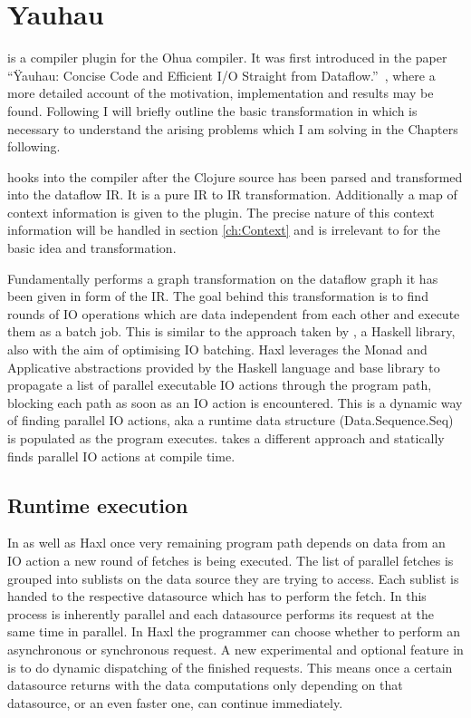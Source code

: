 \chapter{Yauhau}

\label{ch:Yauhau}

\yauhau{} is a compiler plugin for the Ohua compiler.
It was first introduced in the paper ``Ÿauhau: Concise Code and Efficient I/O Straight from Dataflow.''~\cite{ErtelGoensAdamEtAl2016}, where a more detailed account of the motivation, implementation and results may be found.
Following I will briefly outline the basic transformation in \yauhau{} which is necessary to understand the arising problems which I am solving in the Chapters following.

\yauhau{} hooks into the compiler after the Clojure source has been parsed and transformed into the dataflow IR.
It is a pure IR to IR transformation.
Additionally a map of context information is given to the plugin.
The precise nature of this context information will be handled in section \ref{ch:Context} and is irrelevant to for the basic \yauhau{} idea and transformation.

Fundamentally \yauhau{} performs a graph transformation on the dataflow graph it has been given in form of the IR.
The goal behind this transformation is to find rounds of IO operations which are data independent from each other and execute them as a batch job.
This is similar to the approach taken by \cite{Haxl:library:link}, a Haskell library, also with the aim of optimising IO batching.
Haxl leverages the Monad and Applicative abstractions provided by the Haskell language and base library to propagate a list of parallel executable IO actions through the program path, blocking each path as soon as an IO action is encountered.
This is a dynamic way of finding parallel IO actions, aka a runtime data structure (Data.Sequence.Seq) is populated as the program executes.
\yauhau{} takes a different approach and statically finds parallel IO actions at compile time.

\section{Runtime execution}

In \yauhau{} as well as Haxl once very remaining program path depends on data from an IO action a new round of fetches is being executed.
The list of parallel fetches is grouped into sublists on the data source they are trying to access.
Each sublist is handed to the respective datasource which has to perform the fetch.
In \yauhau{} this process is inherently parallel and each datasource performs its request at the same time in parallel.
In Haxl the programmer can choose whether to perform an asynchronous or synchronous request.
A new experimental and optional feature in \yauhau{} is to do dynamic dispatching of the finished requests.
This means once a certain datasource returns with the data computations only depending on that datasource, or an even faster one, can continue immediately.

